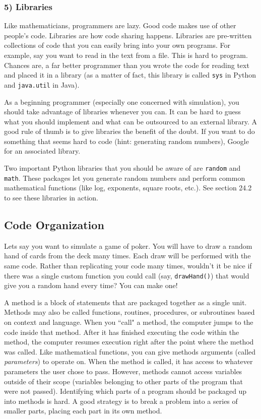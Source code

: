 \documentclass[a4paper]{article}
\begin{document}
\subsubsection{5) Libraries}
Like mathematicians, programmers are lazy. Good code makes use of other people's code. Libraries are how code sharing happens. Libraries are pre-written collections of code that you can easily bring into your own programs. For example, say you want to read in the text from a file. This is hard to program. Chances are, a far better programmer than you wrote the code for reading text and placed it in a library (as a matter of fact, this library is called \texttt{sys} in Python and \texttt{java.util} in Java).

As   a beginning programmer (especially one concerned with simulation), you should take advantage of libraries whenever you can. It can be hard to guess what you should implement and what can be outsourced to an external library. A good rule of thumb is to give libraries the benefit of the doubt. If you want to do something that seems hard to code (hint: generating random numbers), Google for an associated library.

Two important Python libraries that you should be aware of are \texttt{random} and \texttt{math}. These packages let you generate random numbers and perform common mathematical functions (like log, exponents, square roots, etc.). See section 24.2 to see these libraries in action.


\subsection{Code Organization}
Lets say you want to simulate a game of poker. You will have to draw a random hand of cards from the deck many times. Each draw will be performed with the same code. Rather than replicating your code many times, wouldn’t it be nice if there was a single custom function you could call (say, \texttt{drawHand()}) that would give you a random hand every time? You can make one!

A method is a block of statements that are packaged together as a single unit. Methods may also be called functions, routines, procedures, or subroutines based on context and language. When you ``call" a method, the computer jumps to the code inside that method. After it has finished executing the code within the method, the computer resumes execution right after the point where the method was called. Like mathematical functions, you can give methods arguments (called {\it parameters}) to operate on. When the method is called, it has access to whatever parameters the user chose to pass. However, methods cannot access variables outside of their scope (variables belonging to other parts of the program that were not passed). Identifying which parts of a program should be packaged up into methods is hard. A good strategy is to break a problem into a series of smaller parts, placing each part in its own method.
\end{document}
